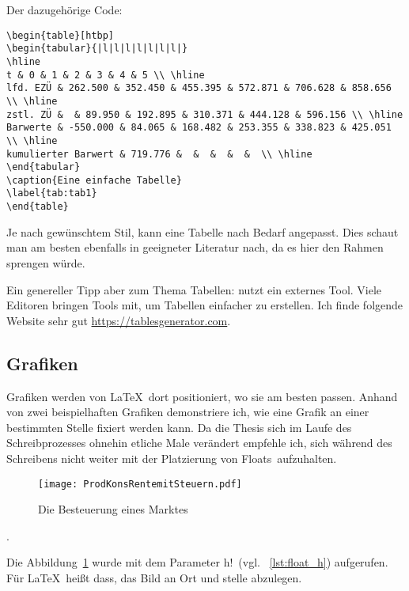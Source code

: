 Der dazugehörige Code:
\begin{lstlisting}[float=htb,caption=Darstellungen einer Tabelle in \protect\LaTeX{},label=lst:bsptabelle]
\begin{table}[htbp]
\begin{tabular}{|l|l|l|l|l|l|l|}
\hline
t & 0 & 1 & 2 & 3 & 4 & 5 \\ \hline
lfd. EZÜ & 262.500 & 352.450 & 455.395 & 572.871 & 706.628 & 858.656 \\ \hline
zstl. ZÜ &  & 89.950 & 192.895 & 310.371 & 444.128 & 596.156 \\ \hline
Barwerte & -550.000 & 84.065 & 168.482 & 253.355 & 338.823 & 425.051 \\ \hline
kumulierter Barwert & 719.776 &  &  &  &  &  \\ \hline
\end{tabular}
\caption{Eine einfache Tabelle}
\label{tab:tab1}
\end{table}
\end{lstlisting}

Je nach gewünschtem Stil, kann eine Tabelle nach Bedarf angepasst. Dies schaut man am besten ebenfalls in geeigneter Literatur nach, da es hier den Rahmen sprengen würde.

Ein genereller Tipp aber zum Thema Tabellen: nutzt ein externes Tool. Viele Editoren bringen Tools mit, um Tabellen einfacher zu erstellen. Ich finde folgende Website sehr gut \href{https://tablesgenerator.com}{https://tablesgenerator.com}.
\subsection{Grafiken}%
\label{sec:graphics}
Grafiken werden von \LaTeX{}\ dort positioniert, wo sie am besten passen. Anhand von zwei beispielhaften Grafiken demonstriere ich, wie eine Grafik an einer bestimmten Stelle fixiert werden kann. Da die Thesis sich im Laufe des Schreibprozesses ohnehin etliche Male verändert empfehle ich, sich während des Schreibens nicht weiter mit der Platzierung von \glqq Floats\grqq\ aufzuhalten.

\begin{figure}[h!]
  \centering
     \texttt{[image: ProdKonsRentemitSteuern.pdf]}
     \caption{Die Besteuerung eines Marktes}
     \label{fig:bild}
\end{figure}

.

Die Abbildung~\ref{fig:bild} wurde mit dem Parameter \glqq h!\grqq\ (vgl. ~\ref{lst:float_h}) aufgerufen. Für \LaTeX{}\ heißt dass, das Bild an Ort und stelle abzulegen.%

